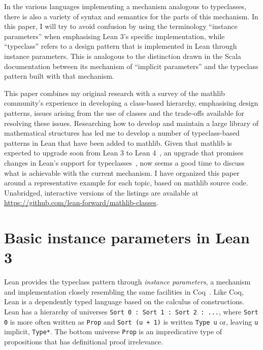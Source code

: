\documentclass[a4paper,UKenglish,cleveref, autoref, thm-restate]{lipics-v2021}
\newcommand{\mathlib}{\textsf{mathlib}\xspace}
\begin{document}
In the various languages implementing a mechanism analogous to typeclasses, there is also a variety of syntax and semantics for the parts of this mechanism.
In this paper, I will try to avoid confusion by using the terminology ``instance parameters'' when emphasising Lean 3's specific implementation,
while ``typeclass'' refers to a design pattern that is implemented in Lean through instance parameters.
This is analogous to the distinction drawn in the Scala documentation between its mechanism of ``implicit parameters'' and the typeclass pattern built with that mechanism.

This paper combines my original research with a survey of the \mathlib community's experience in developing a class-based hierarchy,
emphasising design patterns, issues arising from the use of classes and the trade-offs available for resolving these issues.
Researching how to develop and maintain a large library of mathematical structures
has led me to develop a number of typeclass-based patterns in Lean that have been added to \mathlib.
Given that \mathlib is expected to upgrade soon from Lean 3 to Lean 4~\cite{lean-4}, an upgrade that promises changes in Lean's support for typeclasses~\cite{lean-tabled-typeclasses},
now seems a good time to discuss what is achievable with the current mechanism.
I have organized this paper around a representative example for each topic, based on \mathlib source code.
Unabridged, interactive versions of the listings are available at \url{https://github.com/lean-forward/mathlib-classes}.

\section{Basic instance parameters in Lean 3} \label{sec:basics}
Lean provides the typeclass pattern through \emph{instance parameters}, a mechanism and implementation closely resembling the same facilities in Coq~\cite{Coq-first-class-type-class}.
Like Coq, Lean is a dependently typed language based on the calculus of constructions.
Lean has a hierarchy of universes \lstinline{Sort 0 : Sort 1 : Sort 2 : ...}, where \lstinline{Sort 0} is more often written as \lstinline{Prop} and
\mbox{\lstinline{Sort (u + 1)}} is written \lstinline{Type u} or, leaving \lstinline{u} implicit, \lstinline{Type*}.
The bottom universe \lstinline{Prop} is an impredicative type of propositions that has definitional proof irrelevance.
\end{document}
